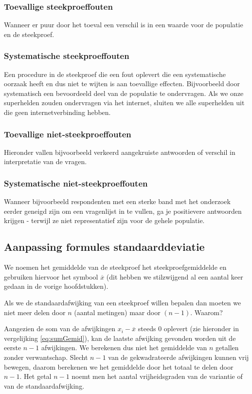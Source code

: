\subsubsection{Toevallige steekproeffouten}
Wanneer er puur door het toeval een verschil is in een waarde voor de populatie en de steekproef.

\subsubsection{Systematische steekproeffouten}
Een procedure in de steekproef die een fout oplevert die een systematische oorzaak heeft en dus niet te wijten is aan toevallige effecten. Bijvoorbeeld door systematisch een bevoordeeld deel van de populatie te ondervragen. Als we onze superhelden zouden ondervragen via het internet, sluiten we alle superhelden uit die geen internetverbinding hebben.

\subsubsection{Toevallige niet-steekproeffouten}
Hieronder vallen bijvoorbeeld verkeerd aangekruiste antwoorden of verschil in interpretatie van de vragen.

\subsubsection{Systematische niet-steekproeffouten}
Wanneer bijvoorbeeld respondenten met een sterke band met het onderzoek eerder geneigd zijn om een vragenlijst in te vullen, ga je positievere antwoorden krijgen - terwijl ze niet representatief zijn voor de gehele populatie.

\subsection{Aanpassing formules standaarddeviatie}
We noemen het gemiddelde van de steekproef het steekproefgemiddelde en gebruiken hiervoor het symbool $\overline{x}$ (dit hebben we stilzwijgend al een aantal keer gedaan in de vorige hoofdstukken).

Als we de standaardafwijking van een steekproef willen bepalen dan moeten we niet meer delen door $n$ (aantal metingen) maar door $(n-1)$. Waarom?

Aangezien de som van de afwijkingen $x_{i} - \overline{x}$ steeds 0 oplevert (zie hieronder in vergelijking \ref{eq:sumGemid}), kan de laatste afwijking gevonden worden uit de eerste $n-1$ afwijkingen. We berekenen dus niet het gemiddelde van $n$ getallen zonder verwantschap. Slecht $n-1$ van de gekwadrateerde afwijkingen kunnen vrij bewegen, daarom berekenen we het gemiddelde door het totaal te delen door $n-1$. Het getal $n-1$ noemt men het aantal vrijheidsgraden van de variantie of van de standaardafwijking.

